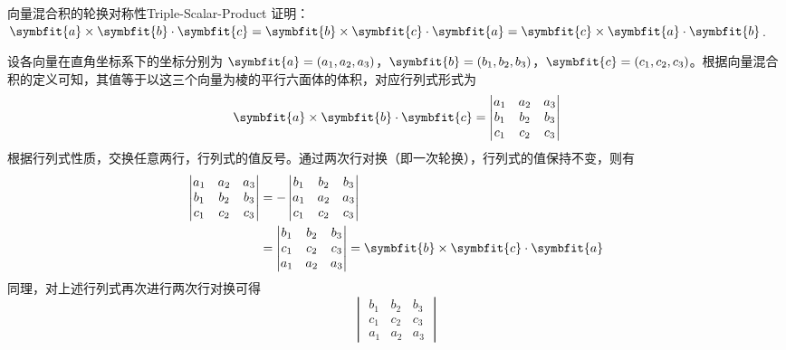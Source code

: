 \begin{problem}{向量混合积的轮换对称性}{Triple-Scalar-Product}
    证明：$\symbfit{a} \times \symbfit{b} \cdot \symbfit{c} = \symbfit{b} \times \symbfit{c} \cdot \symbfit{a} = \symbfit{c} \times \symbfit{a} \cdot \symbfit{b}$.
\end{problem}

\begin{myproof}
    设各向量在直角坐标系下的坐标分别为 $\symbfit{a} = (a_1, a_2, a_3)$，$\symbfit{b} = (b_1, b_2, b_3)$，$\symbfit{c} = (c_1, c_2, c_3)$。根据向量混合积的定义可知，其值等于以这三个向量为棱的平行六面体的体积，对应行列式形式为
    \begin{equation}
        \symbfit{a} \times \symbfit{b} \cdot \symbfit{c} = \begin{vmatrix} a_1 & a_2 & a_3 \\ b_1 & b_2 & b_3 \\ c_1 & c_2 & c_3 \end{vmatrix}
    \end{equation}
    根据行列式性质，交换任意两行，行列式的值反号。通过两次行对换（即一次轮换），行列式的值保持不变，则有
    \begin{equation}
        \begin{aligned}
            \begin{vmatrix} a_1 & a_2 & a_3 \\ b_1 & b_2 & b_3 \\ c_1 & c_2 & c_3 \end{vmatrix}
             & = - \begin{vmatrix} b_1 & b_2 & b_3 \\ a_1 & a_2 & a_3 \\ c_1 & c_2 & c_3 \end{vmatrix}                                                  \\
             & = \begin{vmatrix} b_1 & b_2 & b_3 \\ c_1 & c_2 & c_3 \\ a_1 & a_2 & a_3 \end{vmatrix} = \symbfit{b} \times \symbfit{c} \cdot \symbfit{a}
        \end{aligned}
    \end{equation}
    同理，对上述行列式再次进行两次行对换可得
    \begin{equation}
        \begin{vmatrix} b_1 & b_2 & b_3 \\ c_1 & c_2 & c_3 \\ a_1 & a_2 & a_3 \end{vmatrix}

\end{equation}
\end{myproof}
